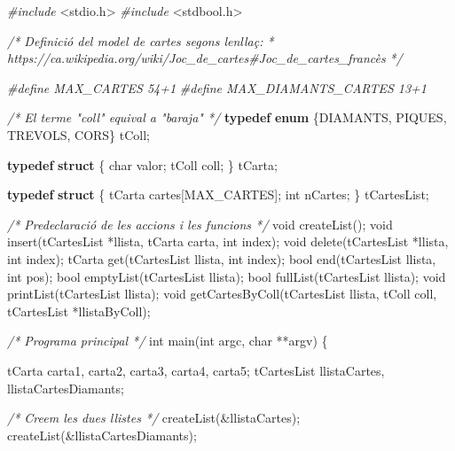 \documentclass[
]{book}
\newenvironment{Shaded}{\begin{snugshade}}{\end{snugshade}}
\newcommand{\CommentTok}[1]{\textcolor[rgb]{0.56,0.35,0.01}{\textit{#1}}}
\newcommand{\DataTypeTok}[1]{\textcolor[rgb]{0.13,0.29,0.53}{#1}}
\newcommand{\ImportTok}[1]{#1}
\newcommand{\KeywordTok}[1]{\textcolor[rgb]{0.13,0.29,0.53}{\textbf{#1}}}
\newcommand{\NormalTok}[1]{#1}
\newcommand{\PreprocessorTok}[1]{\textcolor[rgb]{0.56,0.35,0.01}{\textit{#1}}}
\begin{document}
\begin{Shaded}
\begin{Highlighting}[]
\PreprocessorTok{\#include }\ImportTok{\textless{}stdio.h\textgreater{}}
\PreprocessorTok{\#include }\ImportTok{\textless{}stdbool.h\textgreater{}}

\CommentTok{/* Definició del model de cartes segons l\textquotesingle{}enllaç:}
\CommentTok{ *  https://ca.wikipedia.org/wiki/Joc\_de\_cartes\#Joc\_de\_cartes\_francès }
\CommentTok{ */}

\PreprocessorTok{\#define MAX\_CARTES 54+1}
\PreprocessorTok{\#define MAX\_DIAMANTS\_CARTES 13+1}

\CommentTok{/* El terme "coll" equival a "baraja" */}
\KeywordTok{typedef} \KeywordTok{enum}\NormalTok{ \{DIAMANTS, PIQUES, TREVOLS, CORS\} tColl;}

\KeywordTok{typedef} \KeywordTok{struct}\NormalTok{ \{}
    \DataTypeTok{char}\NormalTok{ valor;}
\NormalTok{    tColl coll;}
\NormalTok{\} tCarta;}

\KeywordTok{typedef} \KeywordTok{struct}\NormalTok{ \{}
\NormalTok{    tCarta cartes[MAX\_CARTES];}
    \DataTypeTok{int}\NormalTok{ nCartes;}
\NormalTok{\} tCartesList;}

\CommentTok{/* Predeclaració de les accions i les funcions */}
\DataTypeTok{void}\NormalTok{ createList();}
\DataTypeTok{void}\NormalTok{ insert(tCartesList *llista, tCarta carta, }\DataTypeTok{int}\NormalTok{ index);}
\DataTypeTok{void}\NormalTok{ delete(tCartesList *llista, }\DataTypeTok{int}\NormalTok{ index);}
\NormalTok{tCarta get(tCartesList llista, }\DataTypeTok{int}\NormalTok{ index);}
\DataTypeTok{bool}\NormalTok{ end(tCartesList llista, }\DataTypeTok{int}\NormalTok{ pos);}
\DataTypeTok{bool}\NormalTok{ emptyList(tCartesList llista);}
\DataTypeTok{bool}\NormalTok{ fullList(tCartesList llista);}
\DataTypeTok{void}\NormalTok{ printList(tCartesList llista);}
\DataTypeTok{void}\NormalTok{ getCartesByColl(tCartesList llista, tColl coll, tCartesList *llistaByColl);}

\CommentTok{/* Programa principal */}
\DataTypeTok{int}\NormalTok{ main(}\DataTypeTok{int}\NormalTok{ argc, }\DataTypeTok{char}\NormalTok{ **argv) \{}

\NormalTok{    tCarta carta1, carta2, carta3, carta4, carta5;}
\NormalTok{    tCartesList llistaCartes, llistaCartesDiamants;}

    \CommentTok{/* Creem les dues llistes */}
\NormalTok{    createList(\&llistaCartes);}
\NormalTok{    createList(\&llistaCartesDiamants);}


\end{Highlighting}
\end{Shaded}
\end{document}
